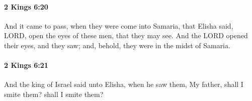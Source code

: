 		\paragraph{2 Kings 6:20} %
			\label{2KINGS-6-20}

			And it came to pass, when they were come into Samaria, that Elisha said, LORD, open the eyes of these men, that they may see. And the LORD opened their eyes, and they saw; and, behold, they were in the midst of Samaria.


		\paragraph{2 Kings 6:21} %
			\label{2KINGS-6-21}

			And the king of Israel said unto Elisha, when he saw them, My father, shall I smite them? shall I smite them?



